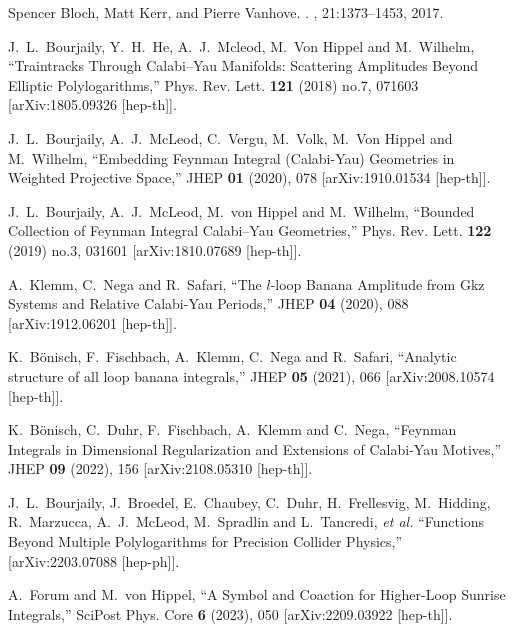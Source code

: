 \documentclass[a4paper,12pt]{article}
\numberwithin{equation}{section}
\numberwithin{figure}{section}
\begin{document}
\begin{thebibliography}{99}
Spencer Bloch, Matt Kerr, and Pierre Vanhove.
.
, 21:1373--1453, 2017.
\newblock [arXiv:1601.08181]

J.~L.~Bourjaily, Y.~H.~He, A.~J.~Mcleod, M.~Von Hippel and M.~Wilhelm,
``Traintracks Through Calabi--Yau Manifolds: Scattering Amplitudes Beyond Elliptic Polylogarithms,''
Phys. Rev. Lett. \textbf{121} (2018) no.7, 071603
[arXiv:1805.09326 [hep-th]].
  

J.~L.~Bourjaily, A.~J.~McLeod, C.~Vergu, M.~Volk, M.~Von Hippel and M.~Wilhelm,
``Embedding Feynman Integral (Calabi-Yau) Geometries in Weighted Projective Space,''
JHEP \textbf{01} (2020), 078
[arXiv:1910.01534 [hep-th]].

J.~L.~Bourjaily, A.~J.~McLeod, M.~von Hippel and M.~Wilhelm,
``Bounded Collection of Feynman Integral Calabi--Yau Geometries,''
Phys. Rev. Lett. \textbf{122} (2019) no.3, 031601
[arXiv:1810.07689 [hep-th]].

A.~Klemm, C.~Nega and R.~Safari,
``The $l$-loop Banana Amplitude from Gkz Systems and Relative Calabi-Yau Periods,''
JHEP \textbf{04} (2020), 088
[arXiv:1912.06201 [hep-th]].

K.~B\"onisch, F.~Fischbach, A.~Klemm, C.~Nega and R.~Safari,
``Analytic structure of all loop banana integrals,''
JHEP \textbf{05} (2021), 066
[arXiv:2008.10574 [hep-th]].


K.~B\"onisch, C.~Duhr, F.~Fischbach, A.~Klemm and C.~Nega,
``Feynman Integrals in Dimensional Regularization and Extensions of Calabi-Yau Motives,''
JHEP \textbf{09} (2022), 156
[arXiv:2108.05310 [hep-th]].

J.~L.~Bourjaily, J.~Broedel, E.~Chaubey, C.~Duhr, H.~Frellesvig, M.~Hidding, R.~Marzucca, A.~J.~McLeod, M.~Spradlin and L.~Tancredi, \textit{et al.}
``Functions Beyond Multiple Polylogarithms for Precision Collider Physics,''
[arXiv:2203.07088 [hep-ph]].


A.~Forum and M.~von Hippel,
``A Symbol and Coaction for Higher-Loop Sunrise Integrals,''
SciPost Phys. Core \textbf{6} (2023), 050
[arXiv:2209.03922 [hep-th]].


\end{thebibliography}
\end{document}
